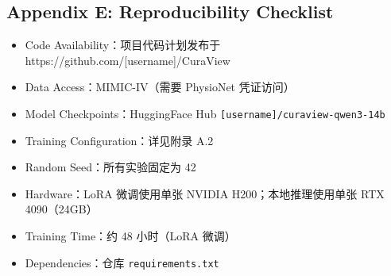 \documentclass[11pt]{article}
\providecommand{\tightlist}{\setlength{\itemsep}{0pt}\setlength{\parskip}{0pt}}
\begin{document}
\subsection{Appendix E: Reproducibility Checklist}

\begin{itemize}
\tightlist
\item
  Code Availability：项目代码计划发布于 https://github.com/{[}username{]}/CuraView
\item
  Data Access：MIMIC-IV（需要 PhysioNet 凭证访问）
\item
  Model Checkpoints：HuggingFace Hub \texttt{{[}username{]}/curaview-qwen3-14b}
\item
  Training Configuration：详见附录 A.2
\item
  Random Seed：所有实验固定为 42
\item
  Hardware：LoRA 微调使用单张 NVIDIA H200；本地推理使用单张 RTX 4090（24GB）
\item
  Training Time：约 48 小时（LoRA 微调）
\item
  Dependencies：仓库 \texttt{requirements.txt}
\end{itemize}



\end{document}
